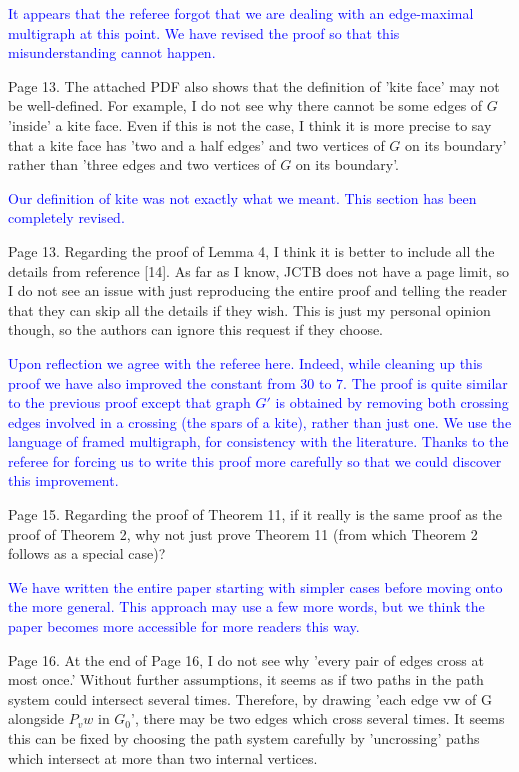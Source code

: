 \documentclass[12pt]{article}
\begin{document}
\textcolor{blue}{It appears that the referee forgot that we are dealing with an edge-maximal multigraph at this point. We have revised the proof so that this misunderstanding cannot happen.}


Page 13. The attached PDF also shows that the definition of 'kite
face' may not be well-defined.  For example, I do not see why there
cannot be some edges of $G$ 'inside' a kite face.  Even if this is not
the case, I think it is more precise to say that a kite face has 'two
and a half edges' and two vertices of $G$ on its boundary' rather than
'three edges and two vertices of $G$ on its boundary'.

\textcolor{blue}{Our definition of kite was not exactly what we meant. This section has been completely revised.}

Page 13.  Regarding the proof of Lemma 4, I think it is better to
include all the details from reference [14].  As far as I know, JCTB
does not have a page limit, so I do not see an issue with just
reproducing the entire proof and telling the reader that they can skip
all the details if they wish.  This is just my personal opinion
though, so the authors can ignore this request if they choose.

\textcolor{blue}{Upon reflection we agree with the referee here. Indeed, while cleaning up this proof we have also improved the constant from $30$ to $7$. The proof is quite similar to the previous proof except that graph $G'$ is obtained by removing both crossing edges involved in a crossing (the spars of a kite), rather than just one.  We use the language of framed multigraph, for consistency with the literature. Thanks to the referee for forcing us to write this proof more carefully so that we could discover this improvement.}

Page 15. Regarding the proof of Theorem 11, if it really is the same
proof as the proof of Theorem 2, why not just prove Theorem 11 (from
which Theorem 2 follows as a special case)?

\textcolor{blue}{We have written the entire paper starting with simpler cases before moving onto the more general. This approach may use a few more words, but we think the paper becomes more accessible for more readers this way.}

Page 16.  At the end of Page 16, I do not see why 'every pair of edges
cross at most once.'  Without further assumptions, it seems as if two
paths in the path system could intersect several times.  Therefore, by
drawing 'each edge vw of G alongside $P_vw$ in $G_0$', there may be two
edges which cross several times.  It seems this can be fixed by
choosing the path system carefully by 'uncrossing' paths which
intersect at more than two internal vertices.
\end{document}
